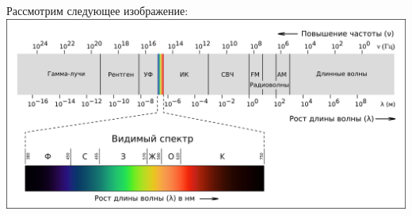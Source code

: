 \documentclass[a4paper, 12pt]{article}
\begin{document}
    Рассмотрим следующее изображение:\\
    
    \centering \includegraphics[width = \textwidth]{image.png} %
\end{document}
